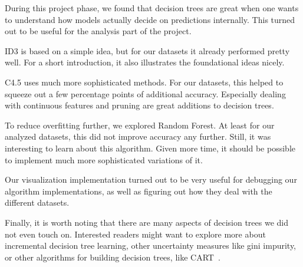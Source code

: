 \documentclass[a4paper]{article}
\begin{document}
During this project phase, we found that decision trees are great when one wants to understand how models actually decide on predictions internally. This turned out to be useful for the analysis part of the project.

ID3 is based on a simple idea, but for our datasets it already performed pretty well. For a short introduction, it also illustrates the foundational ideas nicely.

C4.5 uses much more sophisticated methods. For our datasets, this helped to squeeze out a few percentage points of additional accuracy. Especially dealing with continuous features and pruning are great additions to decision trees.

To reduce overfitting further, we explored Random Forest. At least for our analyzed datasets, this did not improve accuracy any further. Still, it was interesting to learn about this algorithm. Given more time, it should be possible to implement much more sophisticated variations of it.

Our visualization implementation turned out to be very useful for debugging our algorithm implementations, as well as figuring out how they deal with the different datasets.

Finally, it is worth noting that there are many aspects of decision trees we did not even touch on. Interested readers might want to explore more about incremental decision tree learning, other uncertainty measures like gini impurity, or other algorithms for building decision trees, like CART~\cite{friedman2001elements}.



\end{document}
